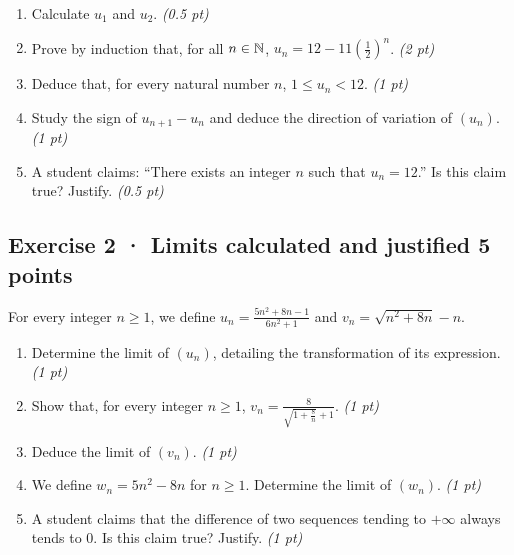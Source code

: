 \begin{enumerate}

\item Calculate $u_1$ and $u_2$. \hfill\textit{(0.5 pt)}

\item Prove by induction that, for all $n\in\mathbb N$, $u_n=12-11\left(\frac{1}{2}\right)^n$. \hfill\textit{(2 pt)}

\item Deduce that, for every natural number $n$, $1\le u_n<12$. \hfill\textit{(1 pt)}

\item Study the sign of $u_{n+1}-u_n$ and deduce the direction of variation of $(u_n)$. \hfill\textit{(1 pt)}

\item A student claims: ``There exists an integer $n$ such that $u_n=12$.'' Is this claim true? Justify. \hfill\textit{(0.5 pt)}

\end{enumerate}

\subsection*{Exercise 2 · Limits calculated and justified \hfill 5 points}For every integer $n\ge1$, we define $u_n=\frac{5n^2+8n-1}{6n^2+1}$ and $v_n=\sqrt{n^2+8n}-n$.

\begin{enumerate}

\item Determine the limit of $(u_n)$, detailing the transformation of its expression. \hfill\textit{(1 pt)}

\item Show that, for every integer $n\ge1$, $v_n=\frac{8}{\sqrt{1+\frac{8}n}+1}$. \hfill\textit{(1 pt)}

\item Deduce the limit of $(v_n)$. \hfill\textit{(1 pt)}

\item We define $w_n=5n^2-8n$ for $n\ge1$. Determine the limit of $(w_n)$. \hfill\textit{(1 pt)}

\item A student claims that the difference of two sequences tending to $+\infty$ always tends to $0$. Is this claim true? Justify. \hfill\textit{(1 pt)}

\end{enumerate}

\clearpage{}\par

